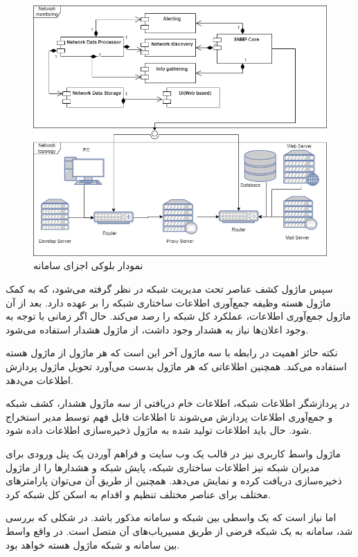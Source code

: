\begin{figure}[!h]
\centering\includegraphics[scale=.55]{./diagram}
\caption{نمودار بلوکی اجزای سامانه}\label{fig.11}
\end{figure}


سپس ماژول کشف عناصر تحت مدیریت شبکه در نظر گرفته می‌شود، که به کمک ماژول هسته وظیفه جمع‌آوری اطلاعات ساختاری شبکه را بر عهده دارد. بعد از آن ماژول جمع‌آوری اطلاعات، عملکرد کل شبکه را رصد می‌کند. حال اگر زمانی با توجه به وجود اعلان‌ها نیاز به هشدار وجود داشت، از ماژول هشدار استفاده می‌شود. 

\newpage

نکته حائز اهمیت در رابطه با سه ماژول آخر این است که هر ماژول از ماژول هسته استفاده می‌کند. همچنین اطلاعاتی که هر ماژول بدست می‌آورد تحویل ماژول پردازش اطلاعات می‌دهد.

در پردازشگر اطلاعات شبکه، اطلاعات خام دریافتی از سه ماژول هشدار، کشف شبکه و جمع‌آوری اطلاعات پردازش می‌شوند تا اطلاعات قابل فهم توسط مدیر استخراج شود. حال باید اطلاعات تولید شده به ماژول ذخیره‌سازی اطلاعات داده شود.

ماژول واسط کاربری نیز در قالب یک وب سایت و فراهم آوردن یک پنل ورودی برای مدیران شبکه نیز اطلاعات ساختاری شبکه، پایش شبکه و هشدارها را از ماژول ذخیره‌سازی دریافت کرده و نمایش می‌دهد. همچنین از طریق آن می‌توان پارامترهای مختلف برای عناصر مختلف تنظیم و اقدام به اسکن کل شبکه کرد.

اما نیاز است که یک واسطی بین شبکه و سامانه مذکور باشد. در شکلی که بررسی شد، سامانه به یک شبکه فرضی از طریق مسیریاب‌های آن متصل است. در واقع واسط بین سامانه و شبکه ماژول هسته  خواهد بود.






